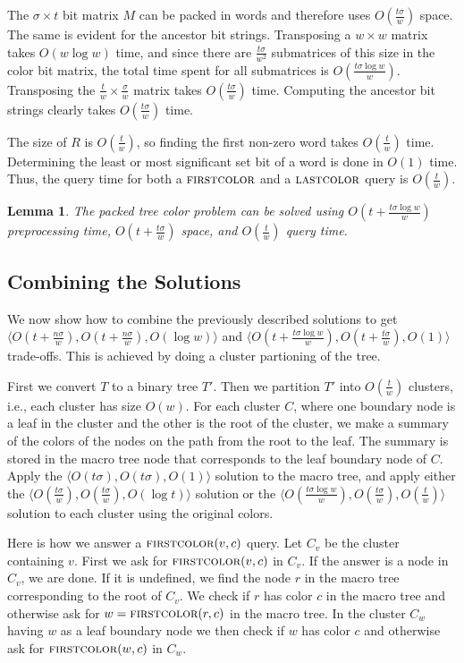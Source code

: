 \documentclass[11pt]{article}
\newcommand{\tree}{\ensuremath{T}}
\newcommand{\fca}{\ensuremath{\textsc{firstcolor}}}
\newcommand{\lca}{\ensuremath{\textsc{lastcolor}}}
\newtheorem{lemma}{Lemma}
\begin{document}
The $\sigma \times t$ bit matrix $M$ can be packed in words and therefore uses $O(\frac{t\sigma}{w})$ space. The same is evident for the ancestor bit strings. Transposing a $w\times w$ matrix takes $O(w\log w)$ time, and since there are $\frac{t\sigma}{w^2}$ submatrices of this size in the color bit matrix, the total time spent for all submatrices is $O(\frac{t\sigma\log w}{w})$. Transposing the $\frac t w \times \frac \sigma w$ matrix takes $O(\frac{t\sigma}{w})$ time. Computing the ancestor bit strings clearly takes $O(\frac{t\sigma}{w})$ time.

The size of $R$ is $O(\frac t w)$, so finding the first non-zero word takes $O(\frac t w)$ time. Determining the least or most significant set bit of a word is done in $O(1)$ time. Thus, the query time for both a $\fca$ and a $\lca$ query is $O(\frac t w)$.

\begin{lemma}
The packed tree color problem can be solved using $O(t+\frac{t\sigma\log w}{w})$ preprocessing time,  $O(t+\frac{t\sigma}{w})$ space, and $O(\frac t w)$ query time.
\end{lemma}

\subsection{Combining the Solutions}
We now show how to combine the previously described solutions to get $\langle O(t+\frac{n\sigma}{w}), O(t+\frac{n\sigma}{w}), O(\log w) \rangle$ and $\langle O(t+\frac{t\sigma\log w}{w}), O(t+\frac{t\sigma}{w}), O(1) \rangle$ trade-offs. This is achieved by doing a cluster partioning of the tree.

First we convert $\tree$ to a binary tree $\tree'$. Then we partition $\tree'$ into $O(\frac t w)$ clusters, i.e., each cluster has size $O(w)$. For each cluster $C$, where one boundary node is a leaf in the cluster and the other is the root of the cluster, we make a summary of the colors of the nodes on the path from the root to the leaf. The summary is stored in the macro tree node that corresponds to the leaf boundary node of $C$. Apply the $\langle O(t\sigma), O(t\sigma), O(1) \rangle$ solution to the macro tree, and apply either the $\langle O(\frac{t\sigma}{w}),O(\frac{t\sigma}{w}),O(\log t) \rangle$ solution or the $\langle O(\frac{t\sigma\log w}{w}),O(\frac{t\sigma}{w}),O(\frac t w) \rangle$ solution to each cluster using the original colors.

Here is how we answer a $\fca(v,c)$ query. Let $C_v$ be the cluster containing $v$. First we ask for $\fca(v,c)$ in $C_v$. If the answer is a node in $C_v$, we are done. If it is undefined, we find the node $r$ in the macro tree corresponding to the root of $C_v$. We check if $r$ has color $c$ in the macro tree and otherwise ask for $w=\fca(r,c)$ in the macro tree. In the cluster $C_w$ having $w$ as a leaf boundary node we then check if $w$ has color $c$ and otherwise ask for $\fca(w,c)$ in $C_w$.
\end{document}
